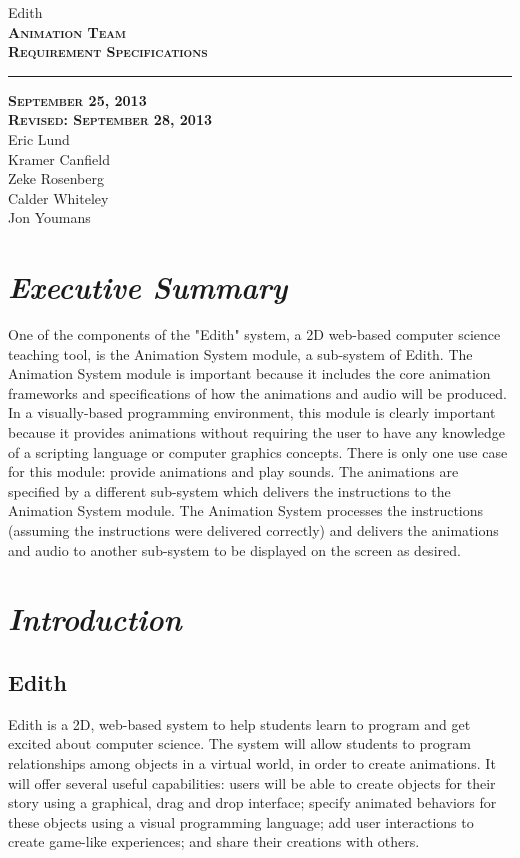 \documentclass[12pt]{article}
\begin{document}
\begin{titlepage}
	\begin{center}
	\huge  Edith \\
	\vspace*{\fill}%
 	\huge \textsc{\textbf{Animation Team \\Requirement Specifications} }	
	\bigskip 
	\rule{130mm}{.1pt}
	\textsc{\textbf{September 25, 2013 \\ Revised: September 28, 2013} \\ }	
	\vspace*{\fill}%
	Eric Lund \\
	Kramer Canfield \\ 
	Zeke Rosenberg \\
	Calder Whiteley \\
	Jon Youmans
	\end{center}
	\end{titlepage}


\section{\emph{Executive Summary}}
One of the components of the "Edith" system, a 2D web-based computer science teaching tool, is the Animation System module, a sub-system of Edith. The Animation System module is important because it includes the core animation frameworks and specifications of how the animations and audio will be produced. In a visually-based programming environment, this module is clearly important because it provides animations without requiring the user to have any knowledge of a scripting language or computer graphics concepts. There is only one use case for this module: provide animations and play sounds. The animations are specified by a different sub-system which delivers the instructions to the Animation System module. The Animation System processes the instructions (assuming the instructions were delivered correctly) and delivers the animations and audio to another sub-system to be displayed on the screen as desired.


\section{\emph{Introduction}}%
	\subsection{Edith}
         Edith is a 2D, web-based system to help students learn to program and get excited about computer science. The system will allow students to program relationships among objects in a virtual world, in order to create animations. It will offer several useful capabilities: users will be able to create objects for their story using a graphical, drag and drop interface; specify animated behaviors for these objects using a visual programming language; add user interactions to create game-like experiences; and share their creations with others. 
\end{document}
